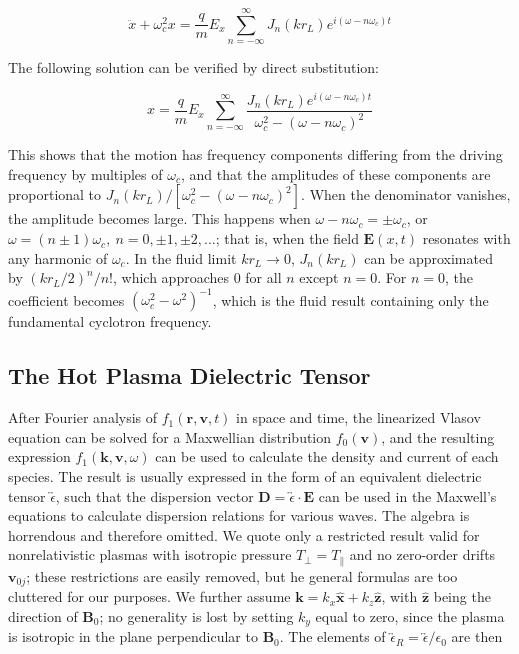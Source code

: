 \documentclass[
  notoc %
]{tufte-book}
\begin{document}
\[
\ddot{x} + \omega_c^2 x = \frac{q}{m}E_x \sum_{n=-\infty}^{\infty}J_n(kr_L) e^{i(\omega-n\omega_c) t}
\]

The following solution can be verified by direct substitution:

\[
x = \frac{q}{m}E_x \sum_{n=-\infty}^{\infty} \frac{J_n(kr_L)e^{i(\omega-n\omega_c) t}}{\omega_c^2 - (\omega - n\omega_c)^2}
\]

This shows that the motion has frequency components differing from the
driving frequency by multiples of \(\omega_c\), and that the amplitudes
of these components are proportional to
\(J_n(kr_L)/[\omega_c^2 - (\omega - n\omega_c)^2]\). When the
denominator vanishes, the amplitude becomes large. This happens when
\(\omega-n\omega_c = \pm \omega_c\), or
\(\omega=(n\pm 1)\omega_c,\ n=0,\pm 1, \pm 2, ...\); that is, when the
field \(\mathbf{E}(x,t)\) resonates with any harmonic of \(\omega_c\).
In the fluid limit \(kr_L\rightarrow 0\), \(J_n(kr_L)\) can be
approximated by \((kr_L/2)^n/n!\), which approaches 0 for all \(n\)
except \(n=0\). For \(n=0\), the coefficient becomes
\((\omega_c^2-\omega^2)^{-1}\), which is the fluid result containing
only the fundamental cyclotron frequency.

\hypertarget{sec:HPDR}{%
\subsection{The Hot Plasma Dielectric Tensor}\label{sec:HPDR}}

After Fourier analysis of \(f_1(\mathbf{r},\mathbf{v},t)\) in space and
time, the linearized Vlasov equation can be solved for a Maxwellian
distribution \(f_0(\mathbf{v})\), and the resulting expression
\(f_1(\mathbf{k},\mathbf{v},\omega)\) can be used to calculate the
density and current of each species. The result is usually expressed in
the form of an equivalent dielectric tensor
\(\overleftrightarrow{\epsilon}\), such that the dispersion vector
\(\mathbf{D}=\overleftrightarrow{\epsilon}\cdot\mathbf{E}\) can be used
in the Maxwell's equations to calculate dispersion relations for various
waves. The algebra is horrendous and therefore omitted. We quote only a
restricted result valid for nonrelativistic plasmas with isotropic
pressure \(T_\perp = T_\parallel\) and no zero-order drifts
\(\mathbf{v}_{0j}\); these restrictions are easily removed, but he
general formulas are too cluttered for our purposes. We further assume
\(\mathbf{k} = k_x\hat{\mathbf{x}} + k_z\hat{\mathbf{z}}\), with
\(\hat{\mathbf{z}}\) being the direction of \(\mathbf{B}_0\); no
generality is lost by setting \(k_y\) equal to zero, since the plasma is
isotropic in the plane perpendicular to \(\mathbf{B}_0\). The elements
of
\(\overleftrightarrow{\epsilon}_R = \overleftrightarrow{\epsilon}/\epsilon_0\)
are then
\end{document}
